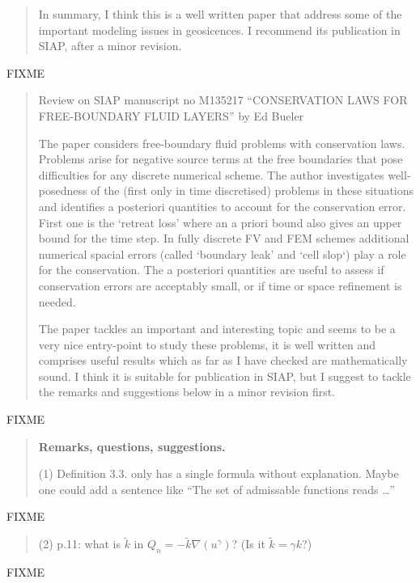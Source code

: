 \documentclass[12pt]{amsart}
\newcommand{\mm}{\medskip \noindent}
\begin{document}
\begin{quote}
In summary, I think this is a well written paper that address some of the important modeling issues in geosicences.  I recommend its publication in SIAP, after a minor revision.
\end{quote}

FIXME

\begin{quote}
Review on SIAP manuscript no M135217 ``CONSERVATION LAWS FOR FREE-BOUNDARY FLUID LAYERS'' by Ed Bueler

\mm The paper considers free-boundary fluid problems with conservation laws. Problems arise for negative source terms at the free boundaries that pose difficulties for any discrete numerical scheme.  The author investigates well-posedness of the (first only in time discretised) problems in these situations and identifies a posteriori quantities to account for the conservation error.  First one is the `retreat loss' where an a priori bound also gives an upper bound for the time step.  In fully discrete FV and FEM schemes additional numerical spacial errors (called `boundary leak' and
`cell slop`) play a role for the conservation.  The a posteriori quantities are useful to assess if conservation errors are acceptably small, or if time or space refinement is needed.

\mm The paper tackles an important and interesting topic and seems to be a very nice entry-point to study these problems, it is well written and comprises useful results which as far as I have checked are mathematically sound.  I think it is suitable for publication in SIAP, but I suggest to tackle the remarks and suggestions below in a minor revision first.
\end{quote}

FIXME

\begin{quote}
\textbf{Remarks, questions, suggestions.}

\mm (1) Definition 3.3. only has a single formula without explanation. Maybe one could add a sentence like ``The set of admissable functions reads \dots''
\end{quote}

FIXME

\begin{quote}
\mm (2) p.11: what is $\tilde k$ in $Q_n = - \tilde k\nabla(u^\gamma)$?  (Is it $\tilde k = \gamma k$?)
\end{quote}

FIXME
\end{document}
